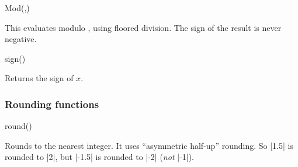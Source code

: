 \begin{math-function}{Mod(,)}
\mathcommand

	This evaluates  modulo , using floored division.
	The sign of the result is never negative.

\begin{codeexample}[]
 \pgfmathresult
\end{codeexample}

\end{math-function}

\begin{math-function}{sign()}
\mathcommand

	Returns the sign of $x$.
	
\begin{codeexample}[]
 \pgfmathresult
\end{codeexample}

\begin{codeexample}[]
 \pgfmathresult
\end{codeexample}

\begin{codeexample}[]
 \pgfmathresult
\end{codeexample}
\end{math-function}




\subsubsection{Rounding functions}

\label{pgfmath-functions-rounding}

\begin{math-function}{round()}
\mathcommand

	Rounds  to the nearest integer. It uses ``asymmetric half-up''
	rounding. So |1.5| is rounded to |2|, but |-1.5| is rounded to |-2|
	(\emph{not} |-1|).

\begin{codeexample}[]
 \pgfmathresult
\end{codeexample}

\begin{codeexample}[]
 \pgfmathresult
\end{codeexample}

\end{math-function}

